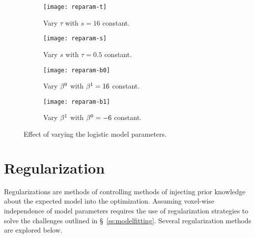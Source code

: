 \begin{figure}
  \centering
  \begin{subfigure}{\plotwidth}
    \texttt{[image: reparam-t]}
    \caption{Vary $\tau$ with $s = 16$ constant.}%
    \label{fig:reparam-t}
  \end{subfigure}
  \begin{subfigure}{\plotwidth}
    \texttt{[image: reparam-s]}
    \caption{Vary $s$ with $\tau = 0.5$ constant.}%
    \label{fig:reparam-s}
  \end{subfigure}
  \begin{subfigure}{\plotwidth}
    \texttt{[image: reparam-b0]}
    \caption{Vary $\beta^0$ with $\beta^1 = 16$ constant.}%
    \label{fig:reparam-b0}
  \end{subfigure}
  \begin{subfigure}{\plotwidth}
    \texttt{[image: reparam-b1]}
    \caption{Vary $\beta^1$ with $\beta^0 = -6$ constant.}%
    \label{fig:reparam-b1}
  \end{subfigure}
  \caption{Effect of varying the logistic model parameters.}%
  \label{fig:reparam}
\end{figure}
\section{Regularization}\label{s:vlr-reg}
Regularizations are
methods of controlling 
methods of injecting prior knowledge about the expected model into the optimization.
Assuming voxel-wise independence of model parameters requires the use of regularization strategies
to solve the challenges outlined in \S~\ref{ss:modelfitting}.
Several regularization methods are explored below.
